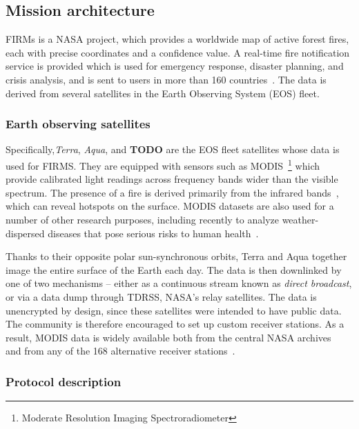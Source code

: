 
\subsection{Mission architecture}

FIRMs is a NASA project, which provides a worldwide map of active forest fires, each with precise coordinates and a confidence value.
A real-time fire notification service is provided which is used for emergency response, disaster planning, and crisis analysis, and is sent to users in more than 160 countries~\cite{firmsUsage}.
The data is derived from several satellites in the Earth Observing System (EOS) fleet.

\subsubsection{Earth observing satellites}

Specifically,\textit{Terra}, \textit{Aqua}, and \textbf{TODO} are the EOS fleet satellites whose data is used for FIRMS.
They are equipped with sensors such as MODIS~\footnote{Moderate Resolution Imaging Spectroradiometer} which provide calibrated light readings across frequency bands wider than the visible spectrum.
The presence of a fire is derived primarily from the infrared bands~\cite{mod14Manual}, which can reveal hotspots on the surface.
MODIS datasets are also used for a number of other research purposes, including recently to analyze weather-dispersed diseases that pose serious risks to human health~\cite{valleyFever}.

Thanks to their opposite polar sun-synchronous orbits, Terra and Aqua together image the entire surface of the Earth each day.
The data is then downlinked by one of two mechanisms -- either as a continuous stream known as \textit{direct broadcast}, or via a data dump through TDRSS, NASA's relay satellites.
The data is unencrypted by design, since these satellites were intended to have public data.
The community is therefore encouraged to set up custom receiver stations.
As a result, MODIS data is widely available both from the central NASA archives~\cite{ladsweb} and from any of the 168 alternative receiver stations~\cite{nasaDirect}.

\subsubsection{Protocol description}


